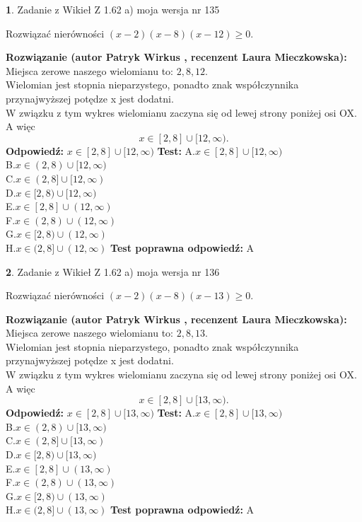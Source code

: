 \documentclass[12pt, a4paper]{article}
\theoremstyle{definition} %
\newtheorem{zad}{}
\newcommand{\zadStart}[1]{\begin{zad}#1\newline}
\newcommand{\zadStop}{\end{zad}}
\newcommand{\rozwStart}[2]{\noindent \textbf{Rozwiązanie (autor #1 , recenzent #2): }\newline}
\newcommand{\rozwStop}{\newline}
\newcommand{\odpStart}{\noindent \textbf{Odpowiedź:}\newline}
\newcommand{\odpStop}{\newline}
\newcommand{\testStart}{\noindent \textbf{Test:}\newline}
\newcommand{\testStop}{\newline}
\newcommand{\kluczStart}{\noindent \textbf{Test poprawna odpowiedź:}\newline}
\newcommand{\kluczStop}{\newline}
\begin{document}
\zadStart{Zadanie z Wikieł Z 1.62 a) moja wersja nr 135}

Rozwiązać nierówności $(x-2)(x-8)(x-12)\ge0$.
\zadStop
\rozwStart{Patryk Wirkus}{Laura Mieczkowska}
Miejsca zerowe naszego wielomianu to: $2, 8, 12$.\\
Wielomian jest stopnia nieparzystego, ponadto znak współczynnika przy\linebreak najwyższej potędze x jest dodatni.\\ W związku z tym wykres wielomianu zaczyna się od lewej strony poniżej osi OX. A więc $$x \in [2,8] \cup [12,\infty).$$
\rozwStop
\odpStart
$x \in [2,8] \cup [12,\infty)$
\odpStop
\testStart
A.$x \in [2,8] \cup [12,\infty)$\\
B.$x \in (2,8) \cup [12,\infty)$\\
C.$x \in (2,8] \cup [12,\infty)$\\
D.$x \in [2,8) \cup [12,\infty)$\\
E.$x \in [2,8] \cup (12,\infty)$\\
F.$x \in (2,8) \cup (12,\infty)$\\
G.$x \in [2,8) \cup (12,\infty)$\\
H.$x \in (2,8] \cup (12,\infty)$
\testStop
\kluczStart
A
\kluczStop



\zadStart{Zadanie z Wikieł Z 1.62 a) moja wersja nr 136}

Rozwiązać nierówności $(x-2)(x-8)(x-13)\ge0$.
\zadStop
\rozwStart{Patryk Wirkus}{Laura Mieczkowska}
Miejsca zerowe naszego wielomianu to: $2, 8, 13$.\\
Wielomian jest stopnia nieparzystego, ponadto znak współczynnika przy\linebreak najwyższej potędze x jest dodatni.\\ W związku z tym wykres wielomianu zaczyna się od lewej strony poniżej osi OX. A więc $$x \in [2,8] \cup [13,\infty).$$
\rozwStop
\odpStart
$x \in [2,8] \cup [13,\infty)$
\odpStop
\testStart
A.$x \in [2,8] \cup [13,\infty)$\\
B.$x \in (2,8) \cup [13,\infty)$\\
C.$x \in (2,8] \cup [13,\infty)$\\
D.$x \in [2,8) \cup [13,\infty)$\\
E.$x \in [2,8] \cup (13,\infty)$\\
F.$x \in (2,8) \cup (13,\infty)$\\
G.$x \in [2,8) \cup (13,\infty)$\\
H.$x \in (2,8] \cup (13,\infty)$
\testStop
\kluczStart
A
\kluczStop
\end{document}
